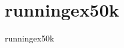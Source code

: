 \section{runningex50k}
\label{sec:dataSets:runningex50k}
\begin{dataSetDescription}{runningex50k}
\end{dataSetDescription}

